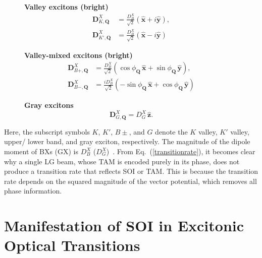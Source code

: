 \begin{figure}[h] 
\centering
\begin{minipage}{0.45\textwidth}
    \centering
    \textbf{Valley excitons (bright)}
    \begin{equation}
    \begin{aligned}
        \boldsymbol{D}^{X}_{K, \boldsymbol{Q}} &= \frac{D^X_B}{\sqrt{2}} (\hat{\boldsymbol{x}}+i\hat{\boldsymbol{y}}), \\
        \boldsymbol{D}^{X}_{K', \boldsymbol{Q}} &= \frac{D^X_B}{\sqrt{2}} (\hat{\boldsymbol{x}}-i\hat{\boldsymbol{y}})
    \end{aligned}
    \end{equation}
\end{minipage}
\hfill
\begin{minipage}{0.52\textwidth}
    \centering
    \textbf{Valley-mixed excitons (bright)}
    \begin{equation}
    \begin{aligned}
        \boldsymbol{D}^{X}_{B+, \boldsymbol{Q}} &= \frac{D^X_B}{\sqrt{2}} \left(\cos\phi_{\boldsymbol{Q}}\,\hat{\boldsymbol{x}} + \sin\phi_{\boldsymbol{Q}}\,\hat{\boldsymbol{y}}\right), \\
        \boldsymbol{D}^{X}_{B-, \boldsymbol{Q}} &= \frac{iD^X_B}{\sqrt{2}} \left(-\sin\phi_{\boldsymbol{Q}}\,\hat{\boldsymbol{x}} + \cos\phi_{\boldsymbol{Q}}\,\hat{\boldsymbol{y}}\right)
    \end{aligned}
    \label{transitiondipole}
    \end{equation}
    
    \textbf{Gray excitons}
    \begin{equation}
        \boldsymbol{D}^{X}_{G, \boldsymbol{Q}} = D^X_G\,\hat{\boldsymbol{z}}.
    \end{equation}
\end{minipage}
\end{figure}

\noindent
Here, the subscript symbols $K$, $K'$, $B\pm$, and $G$ denote the $K$ valley, $K'$ valley, upper/ lower band, and gray exciton, respectively. The magnitude of the dipole moment of BXs (GX) is $D^X_{B}$ ($D^X_G$)~\cite{peng2022tailoring, sanchez2024enhanced}. From Eq.~(\ref{transitionrate}), it becomes clear why a single LG beam, whose TAM is encoded purely in its phase, does not produce a transition rate that reflects SOI or TAM. This is because the transition rate depends on the squared magnitude of the vector potential, which removes all phase information.
%
%
%
%
%
%
\section{Manifestation of SOI in Excitonic Optical Transitions}
